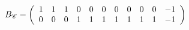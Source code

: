 \[
B_{\mathscr{C}} = 
 \left(\begin{array}{rrrrrrrrrrr}
1 & 1 & 1 & 0 & 0 & 0 & 0 & 0 & 0 & 0 & -1 \\
0 & 0 & 0 & 1 & 1 & 1 & 1 & 1 & 1 & 1 & -1
\end{array}\right) 
\]
